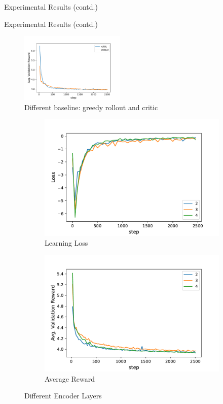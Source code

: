 \documentclass[9pt]{beamer}
\begin{document}
\begin{frame}{Experimental Results (contd.)}

\end{frame}

\begin{frame}{Experimental Results (contd.)}
\begin{figure}[H]
    \centering
    \includegraphics[width=5cm]{images/rollout-critic.pdf}
    \caption{Different baseline: greedy rollout and critic}
    \label{fig:my_label}
\end{figure}
\vspace{-20pt}
\begin{figure}[H]
\captionsetup[subfigure]{justification=centering}
     \centering
    \begin{subfigure}{0.48\linewidth}
         \centering
         \includegraphics[width=0.9\linewidth]{images/layerloss.pdf}
         \caption{Learning Loss}
        \label{fig:bandit}
     \end{subfigure}
      \begin{subfigure}{0.48\linewidth}
         \centering
         \includegraphics[width=0.9\linewidth]{images/layerreward.pdf}
         \caption{Average Reward}
     \end{subfigure}
     \caption{Different Encoder Layers}
\end{figure}



\end{frame}
\end{document}
